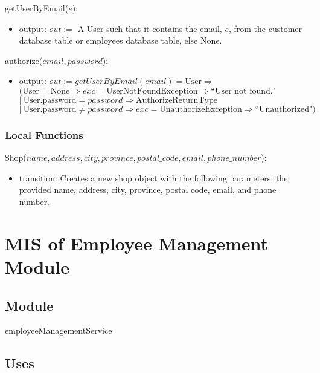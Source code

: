 \documentclass[12pt, titlepage]{article}
\begin{document}
\noindent getUserByEmail($e$):
\begin{itemize}
	\item output: $out :=$ A User such that it contains the email, $e$, from the customer database table or
	      employees database table, else None.
\end{itemize}

\noindent authorize($email, password$):
\begin{itemize}
	\item output: $out := getUserByEmail(email) = \text{User} \Rightarrow $ \\ $(\text{User} = \text{None}
		      \Rightarrow exc = \text{UserNotFoundException} \Rightarrow \text{``User not found."}$ \\ $|\
		      \text{User.password} = password \Rightarrow \text{AuthorizeReturnType}$ \\ $|\ \text{User.password}
		      \neq password \Rightarrow exc = \text{UnauthorizeException} \Rightarrow \text{``Unauthorized"})$
\end{itemize}

\subsubsection{Local Functions}

\noindent Shop($name, address, city, province, postal\_code, email, phone\_number$):
\begin{itemize}
	\item transition: Creates a new shop object with the following parameters: the provided name, address,
	      city, province, postal code, email, and phone number.
\end{itemize}

\newpage

\section{MIS of Employee Management Module} \label{mEmployeeManagement}
\subsection{Module}

employeeManagementService

\subsection{Uses}
\end{document}
